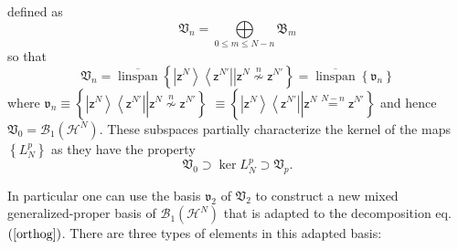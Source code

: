 \documentclass[aps,preprint]{revtex4}%
\begin{document}
defined as
\begin{equation}
\mathfrak{V}_{n}=%
{\displaystyle\bigoplus\limits_{0\leq m\leq N-n}}
\mathfrak{B}_{m}%
\end{equation}
so that
\begin{equation}
\mathfrak{V}_{n}=\overline{\operatorname{linspan}}\left\{  \left.  \left\vert
\mathsf{z}^{N}\right\rangle \left\langle \mathsf{z}^{N\prime}\right\vert
\overset{}{}\right\vert \mathsf{z}^{N}\overset{n}{\nsim}\mathsf{z}^{N\prime
}\right\}  =\overline{\operatorname{linspan}}\left\{  \mathfrak{v}%
_{n}\right\}
\end{equation}
where $\mathfrak{v}_{n}\equiv\left\{  \left.  \underset{}{\left\vert
\mathsf{z}^{N}\right\rangle \left\langle \mathsf{z}^{N\prime}\right\vert
}\right\vert \mathsf{z}^{N}\overset{n}{\nsim}\mathsf{z}^{N\prime}\right\}  $
$\equiv\left\{  \left.  \underset{}{\left\vert \mathsf{z}^{N}\right\rangle
\left\langle \mathsf{z}^{N\prime}\right\vert }\right\vert \mathsf{z}%
^{N}\overset{N-n}{=}\mathsf{z}^{N\prime}\right\}  $ and hence $\mathfrak{V}%
_{0}=\mathcal{B}_{1}\left(  \mathcal{H}^{N}\right)  $. These subspaces
partially characterize the kernel of the maps $\left\{  L_{N}^{p}\right\}  $
as they have the property
\begin{equation}
\mathfrak{V}_{0}\supset\ker L_{N}^{p}\supset\mathfrak{V}_{p}.
\end{equation}


In particular one can use the basis $\mathfrak{v}_{2}$ of $\mathfrak{V}_{2}$
to construct a new mixed generalized-proper basis of $\mathcal{B}_{1}\left(
\mathcal{H}^{N}\right)  $ that is adapted to the decomposition eq. $\left(
\ref{orthog}\right)  $. There are three types of elements in this adapted basis:
\end{document}
